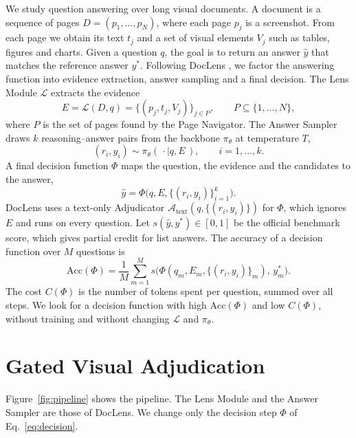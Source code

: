 We study question answering over long visual documents. A document is a sequence of pages $D=(p_1,\dots,p_N)$, where each page $p_j$ is a screenshot. From each page we obtain its text $t_j$ and a set of visual elements $V_j$ such as tables, figures and charts. Given a question $q$, the goal is to return an answer $\hat y$ that matches the reference answer $y^\ast$. Following DocLens \cite{zhu2025doclens}, we factor the answering function into evidence extraction, answer sampling and a final decision. The Lens Module $\mathcal{L}$ extracts the evidence
\begin{equation}
E=\mathcal{L}(D,q)=\{(p_j,t_j,V_j)\}_{j\in P},\qquad P\subseteq\{1,\dots,N\},
\label{eq:lens}
\end{equation}
where $P$ is the set of pages found by the Page Navigator. The Answer Sampler draws $k$ reasoning--answer pairs from the backbone $\pi_\theta$ at temperature $T$,
\begin{equation}
(r_i,y_i)\sim\pi_\theta(\,\cdot\mid q,E\,),\qquad i=1,\dots,k.
\label{eq:sampler}
\end{equation}
A final decision function $\Phi$ maps the question, the evidence and the candidates to the answer,
\begin{equation}
\hat y=\Phi\bigl(q,E,\{(r_i,y_i)\}_{i=1}^{k}\bigr).
\label{eq:decision}
\end{equation}
DocLens uses a text-only Adjudicator $\mathcal{A}_{\mathrm{text}}(q,\{(r_i,y_i)\})$ for $\Phi$, which ignores $E$ and runs on every question. Let $s(\hat y,y^\ast)\in[0,1]$ be the official benchmark score, which gives partial credit for list answers. The accuracy of a decision function over $M$ questions is
\begin{equation}
\mathrm{Acc}(\Phi)=\frac{1}{M}\sum_{m=1}^{M}s\bigl(\Phi(q_m,E_m,\{(r_i,y_i)\}_m),\,y^\ast_m\bigr).
\label{eq:acc}
\end{equation}
The cost $C(\Phi)$ is the number of tokens spent per question, summed over all steps. We look for a decision function with high $\mathrm{Acc}(\Phi)$ and low $C(\Phi)$, without training and without changing $\mathcal{L}$ and $\pi_\theta$.

\section{Gated Visual Adjudication}
\label{sec:method}

Figure~\ref{fig:pipeline} shows the pipeline. The Lens Module and the Answer Sampler are those of DocLens. We change only the decision step $\Phi$ of Eq.~\eqref{eq:decision}.

